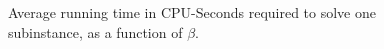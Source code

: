 \begin{figure}[ht!]
    \centering
    
    \caption{Average running time in CPU-Seconds required to solve one subinstance,
             as a function of $\beta$.}
    \label{fig:constructincb}
\end{figure}
\begin{comment}
\begin{table}[ht!]
\centering
\caption{Ignore this table at the moment. Unfinished possible experiment.}
\begin{tabular}{rrrr}
    $\beta$ & \texttt{cClp} & \texttt{cSlp} & Skipped \\ \hline
     1  & 0.01          &               & 6.2 \\
     2  & 0.08          &               & 131.5 \\
     3  & 0.48          &               & 1237.3 \\
     4  & 2.16          &               & 9579.5 \\
     5  & 6.23          &               & 50825.9 \\
     6  & 18.52         &               & 201651.9 \\
     7  & 70.16         &               & 567071.6 \\
     8  & 202.11        &               & 1462074.6 \\
     9  & 379.84        &               & 3351206.6 \\
     10 & 807.85        &               & 6468142.0 \\
     11 & 1997.67       &               & 10606968.5
\end{tabular}
\end{table}
\end{comment}
